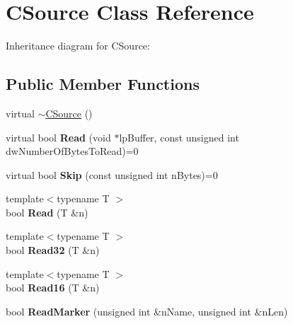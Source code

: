 \hypertarget{class_c_source}{\section{C\+Source Class Reference}
\label{class_c_source}
}


Inheritance diagram for C\+Source\+:
\subsection*{Public Member Functions}
\begin{DoxyCompactItemize}
\item 
virtual \hyperlink{class_c_source_af3d9aa4236021086b9dac54805174ee6}{$\sim$\+C\+Source} ()
\item 
\hypertarget{class_c_source_af6cf3412a890e1935e722d1ef088fab7}{virtual bool {\bfseries Read} (void $\ast$lp\+Buffer, const unsigned int dw\+Number\+Of\+Bytes\+To\+Read)=0}\label{class_c_source_af6cf3412a890e1935e722d1ef088fab7}

\item 
\hypertarget{class_c_source_ab85c6eed9931e097440fc4e248c597b4}{virtual bool {\bfseries Skip} (const unsigned int n\+Bytes)=0}\label{class_c_source_ab85c6eed9931e097440fc4e248c597b4}

\item 
\hypertarget{class_c_source_af00cb9c8fa5a78ac057e72f3b12426e0}{{\footnotesize template$<$typename T $>$ }\\bool {\bfseries Read} (T \&n)}\label{class_c_source_af00cb9c8fa5a78ac057e72f3b12426e0}

\item 
\hypertarget{class_c_source_a4a0484270c64042cf029ee2a2ecdbe8c}{{\footnotesize template$<$typename T $>$ }\\bool {\bfseries Read32} (T \&n)}\label{class_c_source_a4a0484270c64042cf029ee2a2ecdbe8c}

\item 
\hypertarget{class_c_source_af0192af0beb0f29710dab6b99f3a225b}{{\footnotesize template$<$typename T $>$ }\\bool {\bfseries Read16} (T \&n)}\label{class_c_source_af0192af0beb0f29710dab6b99f3a225b}

\item 
\hypertarget{class_c_source_a69dbdf15c490c9ccd997edf21e68eb84}{bool {\bfseries Read\+Marker} (unsigned int \&n\+Name, unsigned int \&n\+Len)}\label{class_c_source_a69dbdf15c490c9ccd997edf21e68eb84}


\end{DoxyCompactItemize}
